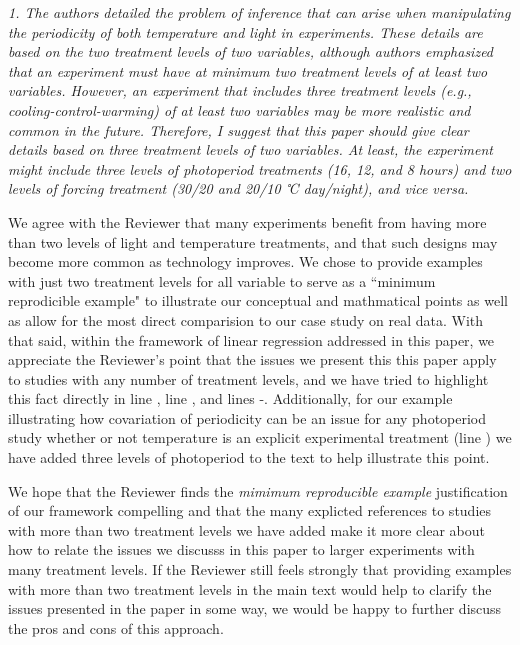 \documentclass[11pt]{article}
\begin{document}
\emph{1. The authors detailed the problem of inference that can arise when manipulating the periodicity of both temperature and light in experiments. These details are based on the two treatment levels of two variables, although authors emphasized that an experiment must have at minimum two treatment levels of at least two variables. However, an experiment that includes three treatment levels (e.g., cooling-control-warming) of at least two variables may be more realistic and common in the future. Therefore, I suggest that this paper should give clear details based on three treatment levels of two variables. At least, the experiment might include three levels of photoperiod treatments (16, 12, and 8 hours) and two levels of forcing treatment (30/20 and 20/10 ℃ day/night), and vice versa.}

We agree with the Reviewer that many experiments benefit from having more than two levels of light and temperature treatments, and that such designs may become more common as technology improves. We chose to provide examples with just two treatment levels for all variable to serve as a ``minimum reprodicible example" to illustrate our conceptual and mathmatical points as well as allow for the most direct comparision to our case study on real data. With that said, within the framework of linear regression addressed in this paper, we appreciate the Reviewer's point that the issues we present this this paper apply to studies with any number of treatment levels, and we have tried to highlight this fact directly in line , line , and lines -.%
Additionally, for our example illustrating how covariation of periodicity can be an issue for any photoperiod study whether or not temperature is an explicit experimental treatment (line ) we have added three levels of photoperiod to the text to help illustrate this point.

We hope that the Reviewer finds the \emph{mimimum reproducible example} justification of our framework compelling and that the many explicted references to studies with more than two treatment levels we have added make it more clear about how to relate the issues we discusss in this paper to larger experiments with many treatment levels. If the Reviewer still feels strongly that providing examples with more than two treatment levels in the main text would help to clarify the issues presented in the paper in some way, we would be happy to further discuss the pros and cons of this approach.
\end{document}
